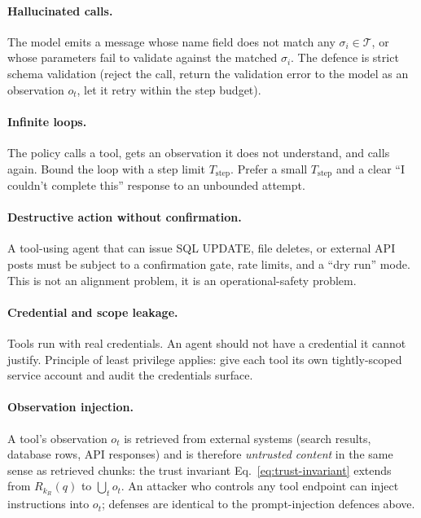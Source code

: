 \paragraph{Hallucinated calls.} The model emits a message whose
name field does not match any $\sigma_i \in \mathcal{T}$, or whose
parameters fail to validate against the matched $\sigma_i$. The
defence is strict schema validation (reject the call, return the
validation error to the model as an observation $o_t$, let it
retry within the step budget).

\paragraph{Infinite loops.} The policy calls a tool, gets an
observation it does not understand, and calls again. Bound the
loop with a step limit $T_\mathrm{step}$. Prefer a small
$T_\mathrm{step}$ and a clear ``I couldn't complete this'' response
to an unbounded attempt.

\paragraph{Destructive action without confirmation.} A tool-using
agent that can issue SQL UPDATE, file deletes, or external API
posts must be subject to a confirmation gate, rate limits, and a
``dry run'' mode. This is not an alignment problem, it is an
operational-safety problem.

\paragraph{Credential and scope leakage.} Tools run with real
credentials. An agent should not have a credential it cannot
justify. Principle of least privilege applies: give each tool its
own tightly-scoped service account and audit the credentials
surface.

\paragraph{Observation injection.} A tool's observation $o_t$ is
retrieved from external systems (search results, database rows,
API responses) and is therefore \emph{untrusted content} in the
same sense as retrieved chunks: the trust invariant
Eq.~\eqref{eq:trust-invariant} extends from $R_{k_R}(q)$ to
$\bigcup_t o_t$. An attacker who controls any tool endpoint can
inject instructions into $o_t$; defenses are identical to the
prompt-injection defences above.

